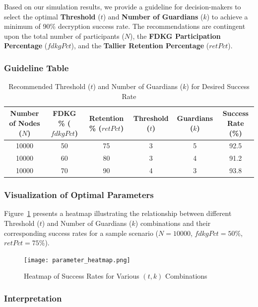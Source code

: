 \documentclass[runningheads]{llncs}
\begin{document}
Based on our simulation results, we provide a guideline for decision-makers to select the optimal \textbf{Threshold} ($t$) and \textbf{Number of Guardians} ($k$) to achieve a minimum of 90\% decryption success rate. The recommendations are contingent upon the total number of participants ($N$), the \textbf{FDKG Participation Percentage} ($fdkgPct$), and the \textbf{Tallier Retention Percentage} ($retPct$).

\subsubsection{Guideline Table}

\begin{table}[h]
\centering
\caption{Recommended Threshold ($t$) and Number of Guardians ($k$) for Desired Success Rate}
\label{tab:parameter_recommendation}
\begin{tabular}{cccccc}
\toprule
\textbf{Number of Nodes} ($N$) & \textbf{FDKG \%} ($fdkgPct$) & \textbf{Retention \%} ($retPct$) & \textbf{Threshold} ($t$) & \textbf{Guardians} ($k$) & \textbf{Success Rate (\%)} \\
\midrule
10000 & 50 & 75 & 3 & 5 & 92.5 \\
10000 & 60 & 80 & 3 & 4 & 91.2 \\
10000 & 70 & 90 & 4 & 3 & 93.8 \\
\bottomrule
\end{tabular}
\end{table}

\subsubsection{Visualization of Optimal Parameters}

Figure~\ref{fig:parameter_heatmap} presents a heatmap illustrating the relationship between different Threshold ($t$) and Number of Guardians ($k$) combinations and their corresponding success rates for a sample scenario ($N=10000$, $fdkgPct=50\%$, $retPct=75\%$).

\begin{figure}[h]
\centering
\texttt{[image: parameter\_heatmap.png]}
\caption{Heatmap of Success Rates for Various $(t, k)$ Combinations}
\label{fig:parameter_heatmap}
\end{figure}

\subsubsection{Interpretation}
\end{document}
